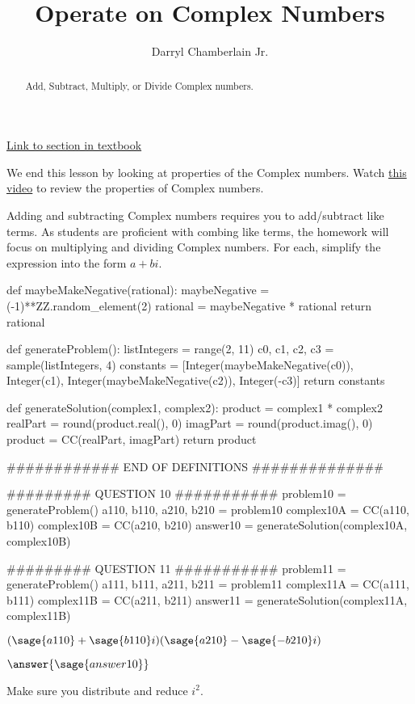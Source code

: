 \documentclass{ximera}
\author{Darryl Chamberlain Jr.}
\title{Operate on Complex Numbers}
\begin{document}
\begin{abstract}
Add, Subtract, Multiply, or Divide Complex numbers.
\end{abstract}
\maketitle

\href{https://cnx.org/contents/mwjClAV_@8.1:Sqk1HAGf@9/Complex-Numbers}{Link to section in textbook}


We end this lesson by looking at properties of the Complex numbers. Watch \href{https://mediasite.video.ufl.edu/Mediasite/Play/69538629caa6442981b77ebb679edc1e1d}{this video} to review the properties of Complex numbers.

Adding and subtracting Complex numbers requires you to add/subtract like terms. As students are proficient with combing like terms, the homework will focus on multiplying and dividing Complex numbers. For each, simplify the expression into the form $a+bi$.

\begin{sagesilent}
def maybeMakeNegative(rational):
    maybeNegative = (-1)**ZZ.random_element(2)
    rational = maybeNegative * rational
    return rational

def generateProblem():
    listIntegers = range(2, 11)
    c0, c1, c2, c3 = sample(listIntegers, 4)
    constants = [Integer(maybeMakeNegative(c0)), Integer(c1), Integer(maybeMakeNegative(c2)), Integer(-c3)]
    return constants

def generateSolution(complex1, complex2):
    product = complex1 * complex2
    realPart = round(product.real(), 0)
    imagPart = round(product.imag(), 0)
    product = CC(realPart, imagPart)
    return product

############ END OF DEFINITIONS ##############

######### QUESTION 10 ###########
problem10 = generateProblem()
a110, b110, a210, b210 = problem10
complex10A = CC(a110, b110)
complex10B = CC(a210, b210)
answer10 = generateSolution(complex10A, complex10B)

######### QUESTION 11 ###########
problem11 = generateProblem()
a111, b111, a211, b211 = problem11
complex11A = CC(a111, b111)
complex11B = CC(a211, b211)
answer11 = generateSolution(complex11A, complex11B)
\end{sagesilent}

\begin{exercise}
$(\sage{a110}+\sage{b110}i)(\sage{a210}-\sage{-b210}i)$

$\answer{\sage{answer10}}$

\begin{hint}
Make sure you distribute and reduce $i^2$.
\end{hint}
\end{exercise}
\end{document}
